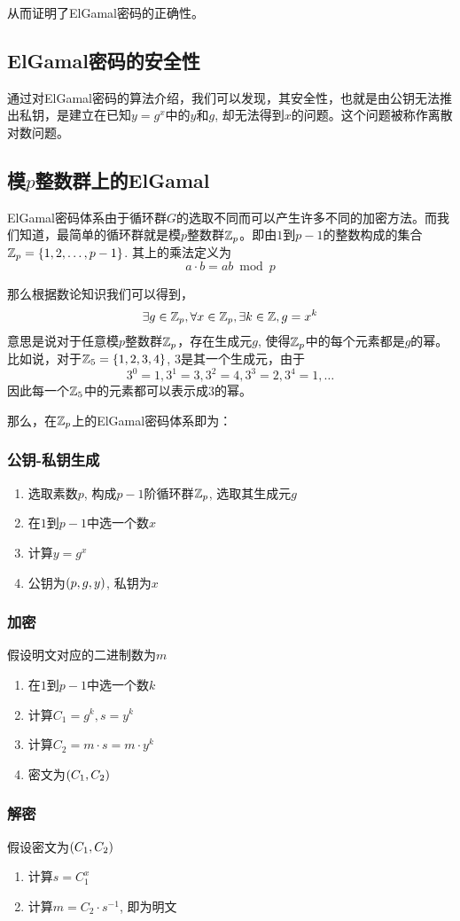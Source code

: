 从而证明了ElGamal密码的正确性。
\subsection{ElGamal密码的安全性}
通过对ElGamal密码的算法介绍，我们可以发现，其安全性，也就是由公钥无法推出私钥，是建立在已知$y=g^x$中的$y$和$g$, 却无法得到$x$的问题。这个问题被称作离散对数问题。
\subsection{模$p$整数群上的ElGamal}
ElGamal密码体系由于循环群$G$的选取不同而可以产生许多不同的加密方法。而我们知道，最简单的循环群就是模$p$整数群$\mathbb{Z}_p$。即由$1$到$p-1$的整数构成的集合$\mathbb{Z}_p=\left\{ {1, 2,\ldots, p-1} \right\}$. 其上的乘法定义为
\[a\cdot b=ab\bmod{p}\]

那么根据数论知识我们可以得到，
\[\exists g\in \mathbb{Z}_p, \forall x\in\mathbb{Z}_p, \exists k\in \mathbb{Z}, g=x^k\]
意思是说对于任意模$p$整数群$\mathbb{Z}_p$，存在生成元$g$, 使得$\mathbb{Z}_p$中的每个元素都是$g$的幂。比如说，对于$\mathbb{Z}_5=\left\{ {1, 2, 3, 4} \right\}$, $3$是其一个生成元，由于
\[3^0=1, 3^1=3, 3^2=4, 3^3=2, 3^4=1,\ldots\]
因此每一个$\mathbb{Z}_5$中的元素都可以表示成$3$的幂。\par
那么，在$\mathbb{Z}_p$上的ElGamal密码体系即为：
\subsubsection{公钥-私钥生成}
\begin{enumerate}
	\item 选取素数$p$, 构成$p-1$阶循环群$\mathbb{Z}_p$, 选取其生成元$g$
	\item 在$1$到$p-1$中选一个数$x$
	\item 计算$y=g^x$
	\item 公钥为$\left( {p, g, y}\right)$, 私钥为$x$
\end{enumerate}
\subsubsection{加密}
假设明文对应的二进制数为$m$
\begin{enumerate}
	\item 在$1$到$p-1$中选一个数$k$
	\item 计算$C_1=g^k, s=y^k$
	\item 计算$C_2=m\cdot s=m\cdot y^k$
	\item 密文为$\left( {C_1, C_2}\right)$
\end{enumerate}
\subsubsection{解密}
假设密文为$\left( {C_1, C_2}\right)$
\begin{enumerate}
	\item 计算$s=C_1^x$
	\item 计算$m=C_2\cdot s^{-1}$, 即为明文
\end{enumerate}
